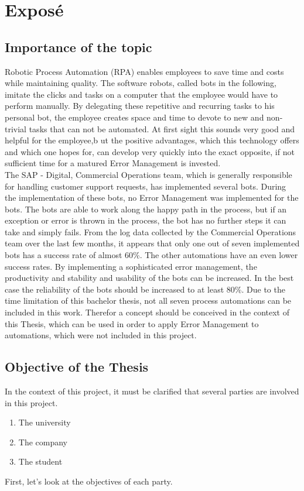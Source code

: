 
\chapter{Exposé}\label{ch:exposé}


\section{Importance of the topic}
Robotic Process Automation (RPA) enables employees to save time and costs while maintaining quality.
The software robots,
called bots in the following, imitate the clicks and tasks on a computer that the employee would have to perform manually.
By delegating these repetitive and recurring tasks to his personal bot, the employee creates space and time to devote to
new and non-trivial tasks that can not be automated.
At first sight this sounds very good and helpful for the employee,b ut the positive advantages, which this technology
offers and which one hopes for, can develop very quickly into the exact opposite, if not sufficient time for a matured
Error Management is invested.\\

The SAP - Digital, Commercial Operations team, which is generally responsible for handling customer support requests,
has implemented several bots.
During the implementation of these bots, no Error Management was implemented for the bots.
The bots are able to work along the happy path in the process, but if an exception or error is thrown in the process,
the bot has no further steps it can take and simply fails.
From the log data collected by the Commercial Operations team over the last few months, it appears that only one out
of seven implemented bots has a success rate of almost 60\%.
The other automations have an even lower success rates.
By implementing a sophisticated error management, the productivity and stability and usability of the bots can be
increased.
In the best case the reliability of the bots should be increased to at least 80\%.
Due to the time limitation of this bachelor thesis, not all seven process automations can be included in this work.
Therefor a concept should be conceived in the context of this Thesis, which can be used in order to apply
Error Management to automations, which were not included in this project.

\section{Objective of the Thesis}\label{sec:objective-of-the-thesis}
In the context of this project, it must be clarified that several parties are involved in this project.\\
\begin{enumerate}
    \item{The university}
    \item{The company}
    \item{The student}
\end{enumerate}
First, let's look at the objectives of each party.\\

